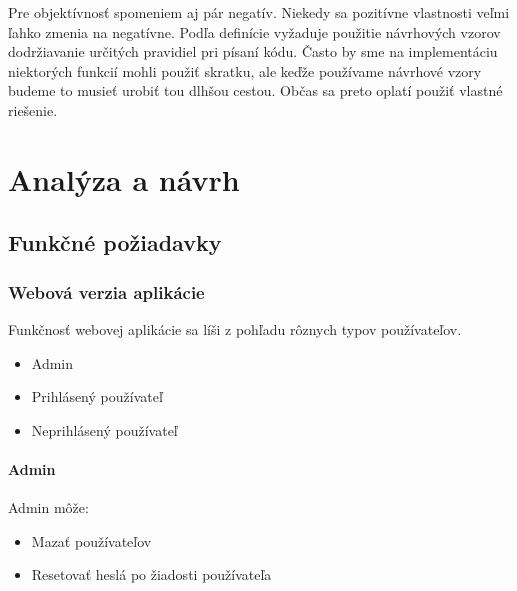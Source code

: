 \documentclass[12pt]{book}
\begin{document}
Pre objektívnosť spomeniem aj pár negatív. Niekedy sa pozitívne vlastnosti veľmi ľahko zmenia na negatívne. Podľa definície vyžaduje použitie návrhových vzorov dodržiavanie určitých pravidiel pri písaní kódu. Často by sme na implementáciu niektorých funkcií mohli použiť skratku, ale keďže používame návrhové vzory budeme to musieť urobiť tou dlhšou cestou. Občas sa preto oplatí použiť vlastné riešenie.

\chapter{Analýza a návrh}
\section{Funkčné požiadavky}
\subsection{Webová verzia aplikácie}
Funkčnosť webovej aplikácie sa líši z pohľadu rôznych typov používateľov.
\begin{itemize}
\item{Admin}
\item{Prihlásený používateľ}
\item{Neprihlásený používateľ}
\end{itemize}

\subsubsection{Admin}
Admin môže:
\begin{itemize}
\item{Mazať používateľov}
\item{Resetovať heslá po žiadosti používateľa}
\end{itemize}
\end{document}

